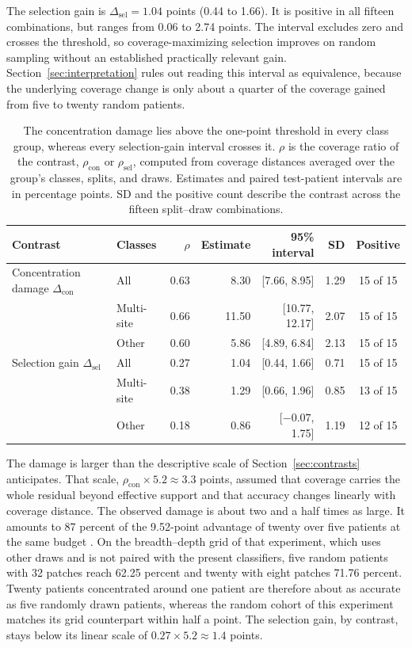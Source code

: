 The selection gain is $\Delta_{\mathrm{sel}}=1.04$ points (0.44 to 1.66). It is positive in all fifteen combinations, but ranges from 0.06 to 2.74 points. The interval excludes zero and crosses the threshold, so coverage-maximizing selection improves on random sampling without an established practically relevant gain. Section~\ref{sec:interpretation} rules out reading this interval as equivalence, because the underlying coverage change is only about a quarter of the coverage gained from five to twenty random patients.

\begin{table}[htbp]
\centering
\small
\renewcommand{\arraystretch}{1.15}
\begin{tabular}{@{}llrrrrc@{}}
\toprule
Contrast & Classes & $\rho$ & Estimate & 95\% interval & SD & Positive \\
\midrule
Concentration damage $\Delta_{\mathrm{con}}$ & All & 0.63 & 8.30 & [7.66, 8.95] & 1.29 & 15 of 15 \\
 & Multi-site & 0.66 & 11.50 & [10.77, 12.17] & 2.07 & 15 of 15 \\
 & Other & 0.60 & 5.86 & [4.89, 6.84] & 2.13 & 15 of 15 \\
\addlinespace
Selection gain $\Delta_{\mathrm{sel}}$ & All & 0.27 & 1.04 & [0.44, 1.66] & 0.71 & 15 of 15 \\
 & Multi-site & 0.38 & 1.29 & [0.66, 1.96] & 0.85 & 13 of 15 \\
 & Other & 0.18 & 0.86 & [$-0.07$, 1.75] & 1.19 & 12 of 15 \\
\bottomrule
\end{tabular}
\caption{The concentration damage lies above the one-point threshold in every class group, whereas every selection-gain interval crosses it. $\rho$ is the coverage ratio of the contrast, $\rho_{\mathrm{con}}$ or $\rho_{\mathrm{sel}}$, computed from coverage distances averaged over the group's classes, splits, and draws. Estimates and paired test-patient intervals are in percentage points. SD and the positive count describe the contrast across the fifteen split--draw combinations.}
\label{tab:contrasts}
\end{table}

The damage is larger than the descriptive scale of Section~\ref{sec:contrasts} anticipates. That scale, $\rho_{\mathrm{con}}\times 5.2\approx 3.3$ points, assumed that coverage carries the whole residual beyond effective support and that accuracy changes linearly with coverage distance. The observed damage is about two and a half times as large. It amounts to 87 percent of the 9.52-point advantage of twenty over five patients at the same budget \citep{queisler2026effectiveSupport}. On the breadth--depth grid of that experiment, which uses other draws and is not paired with the present classifiers, five random patients with 32 patches reach 62.25 percent and twenty with eight patches 71.76 percent. Twenty patients concentrated around one patient are therefore about as accurate as five randomly drawn patients, whereas the random cohort of this experiment matches its grid counterpart within half a point. The selection gain, by contrast, stays below its linear scale of $0.27\times 5.2\approx 1.4$ points.

